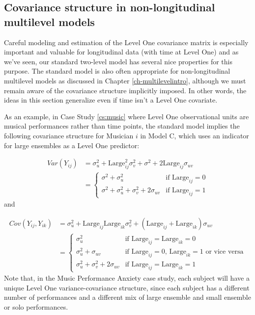 \documentclass[
]{krantz}
\begin{document}
\hypertarget{covariance-structure-in-non-longitudinal-multilevel-models}{%
\subsection{Covariance structure in non-longitudinal multilevel models}\label{covariance-structure-in-non-longitudinal-multilevel-models}}

Careful modeling and estimation of the Level One covariance matrix is especially important and valuable for longitudinal data (with time at Level One) and as we've seen, our standard two-level model has several nice properties for this purpose. The standard model is also often appropriate for non-longitudinal multilevel models as discussed in Chapter \ref{ch-multilevelintro}, although we must remain aware of the covariance structure implicitly imposed. In other words, the ideas in this section generalize even if time isn't a Level One covariate.

As an example, in Case Study \ref{cs:music} where Level One observational units are musical performances rather than time points, the standard model implies the following covariance structure for Musician \(i\) in Model C, which uses an indicator for large ensembles as a Level One predictor:

\begin{align*}
Var(Y_{ij}) & = \sigma_{u}^{2} + \textrm{Large}^{2}_{ij} \sigma_{v}^{2} + \sigma^{2} + 2\textrm{Large}_{ij}\sigma_{uv} \\
 & = \left\{ \begin{array}{ll}
                 \sigma^{2} + \sigma_{u}^{2} & \mbox{if $\textrm{Large}_{ij}=0$} \\
                 \sigma^{2} + \sigma_{u}^{2} + \sigma_{v}^{2} + 2\sigma_{uv} & \mbox{if $\textrm{Large}_{ij}=1$}
               \end{array}
       \right.
\end{align*}
\noindent and

\begin{align*}
Cov(Y_{ij},Y_{ik}) & = \sigma_{u}^{2} + \textrm{Large}_{ij}\textrm{Large}_{ik} \sigma_{v}^{2} + (\textrm{Large}_{ij} + 
  \textrm{Large}_{ik}) \sigma_{uv} \\
 & = \left\{ \begin{array}{ll}
                 \sigma_{u}^{2} & \mbox{if $\textrm{Large}_{ij}=\textrm{Large}_{ik}=0$} \\
                 \sigma_{u}^{2} + \sigma_{uv} & \mbox{if $\textrm{Large}_{ij}=0$, $\textrm{Large}_{ik}=1$ or vice versa} \\
                 \sigma_{u}^{2} + \sigma_{v}^{2} + 2\sigma_{uv} & \mbox{if $\textrm{Large}_{ij}=\textrm{Large}_{ik}=1$}
               \end{array}
       \right.
\end{align*}
Note that, in the Music Performance Anxiety case study, each subject will have a unique Level One variance-covariance structure, since each subject has a different number of performances and a different mix of large ensemble and small ensemble or solo performances.
\end{document}
